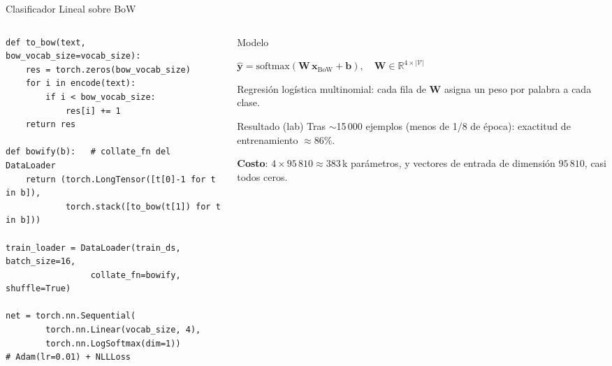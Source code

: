 \documentclass[aspectratio=169, 10pt]{beamer}
\providecommand{\R}{\mathbb{R}}
\newcommand{\V}{\mathcal{V}}
\newcommand{\formula}[1]{%
	\begin{tcolorbox}[colback=UCMBlue!8, colframe=UCMBlue, arc=4pt,
		boxsep=2pt, left=6pt, right=6pt, top=3pt, bottom=3pt]
		#1
	\end{tcolorbox}
}
\begin{document}
\begin{frame}[fragile]{Clasificador Lineal sobre BoW}

	\begin{columns}[T]
		\begin{column}{0.55\textwidth}
			\begin{tcolorbox}[codebox]
\scriptsize
\begin{verbatim}
def to_bow(text, bow_vocab_size=vocab_size):
    res = torch.zeros(bow_vocab_size)
    for i in encode(text):
        if i < bow_vocab_size:
            res[i] += 1
    return res

def bowify(b):   # collate_fn del DataLoader
    return (torch.LongTensor([t[0]-1 for t in b]),
            torch.stack([to_bow(t[1]) for t in b]))

train_loader = DataLoader(train_ds, batch_size=16,
                 collate_fn=bowify, shuffle=True)

net = torch.nn.Sequential(
        torch.nn.Linear(vocab_size, 4),
        torch.nn.LogSoftmax(dim=1))
# Adam(lr=0.01) + NLLLoss
\end{verbatim}
			\end{tcolorbox}
		\end{column}

		\begin{column}{0.42\textwidth}
			\begin{block}{Modelo}
				\formula{\centering $\hat{\mathbf{y}} = \mathrm{softmax}(\mathbf{W}\,\mathbf{x}_{\text{BoW}} + \mathbf{b}),\quad \mathbf{W}\in\R^{4\times|\V|}$}
				\small
				Regresi\'on log\'istica multinomial: cada fila de $\mathbf{W}$ asigna un peso por palabra a cada clase.
			\end{block}

			\begin{block}{Resultado (lab)}
				\small
				Tras $\sim$15\,000 ejemplos (menos de 1/8 de \'epoca): exactitud de entrenamiento $\approx 86\%$.
			\end{block}

			{\small \textbf{Costo}: $4 \times 95\,810 \approx 383$\,k par\'ametros, y vectores de entrada de dimensi\'on $95\,810$, casi todos ceros.}
		\end{column}
	\end{columns}

\end{frame}
\end{document}
